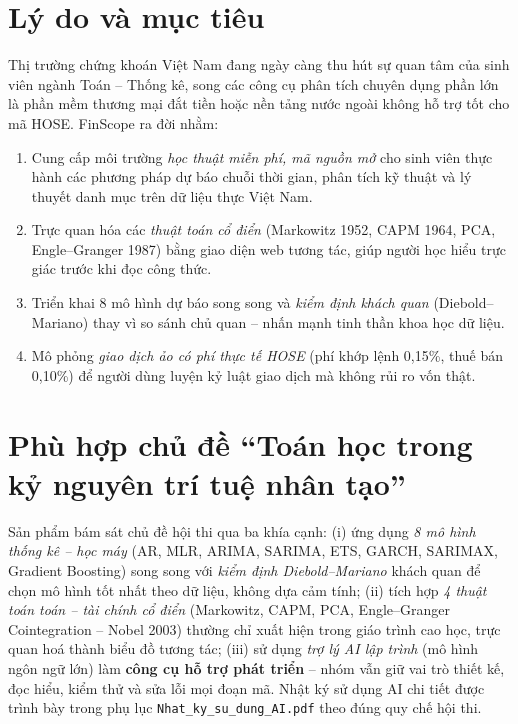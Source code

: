 \documentclass[12pt,a4paper,openany,oneside]{report}
\numberwithin{equation}{chapter}
\begin{document}
\section{Lý do và mục tiêu}

\indent Thị trường chứng khoán Việt Nam đang ngày càng thu hút sự quan
tâm của sinh viên ngành Toán -- Thống kê, song các công cụ phân tích
chuyên dụng phần lớn là phần mềm thương mại đắt tiền hoặc nền tảng nước
ngoài không hỗ trợ tốt cho mã HOSE. FinScope ra đời nhằm:

\begin{enumerate}[leftmargin=22pt,topsep=2pt,itemsep=4pt]
  \item Cung cấp môi trường \emph{học thuật miễn phí, mã nguồn mở} cho
   sinh viên thực hành các phương pháp dự báo chuỗi thời gian, phân
   tích kỹ thuật và lý thuyết danh mục trên dữ liệu thực Việt Nam.
  \item Trực quan hóa các \emph{thuật toán cổ điển} (Markowitz 1952,
   CAPM 1964, PCA, Engle--Granger 1987) bằng giao diện web tương
   tác, giúp người học hiểu trực giác trước khi đọc công thức.
  \item Triển khai 8 mô hình dự báo song song và \emph{kiểm định khách
   quan} (Diebold--Mariano) thay vì so sánh chủ quan -- nhấn mạnh tinh
   thần khoa học dữ liệu.
  \item Mô phỏng \emph{giao dịch ảo có phí thực tế HOSE} (phí khớp lệnh
   0{,}15\%, thuế bán 0{,}10\%) để người dùng luyện kỷ luật giao dịch
   mà không rủi ro vốn thật.
\end{enumerate}

\section{Phù hợp chủ đề ``Toán học trong kỷ nguyên trí tuệ nhân tạo''}

\indent Sản phẩm bám sát chủ đề hội thi qua ba khía cạnh: (i) ứng dụng
\emph{8 mô hình thống kê -- học máy} (AR, MLR, ARIMA, SARIMA, ETS, GARCH,
SARIMAX, Gradient Boosting) song song với \emph{kiểm định Diebold--Mariano}
khách quan để chọn mô hình tốt nhất theo dữ liệu, không dựa cảm tính;
(ii) tích hợp \emph{4 thuật toán toán -- tài chính cổ điển} (Markowitz,
CAPM, PCA, Engle--Granger Cointegration -- Nobel 2003) thường chỉ xuất
hiện trong giáo trình cao học, trực quan hoá thành biểu đồ tương tác;
(iii) sử dụng \emph{trợ lý AI lập trình} (mô hình ngôn ngữ lớn) làm
\textbf{công cụ hỗ trợ phát triển} -- nhóm vẫn giữ vai trò thiết kế, đọc
hiểu, kiểm thử và sửa lỗi mọi đoạn mã. Nhật ký sử dụng AI chi tiết được
trình bày trong phụ lục \texttt{Nhat\_ky\_su\_dung\_AI.pdf} theo đúng
quy chế hội thi.
\end{document}
